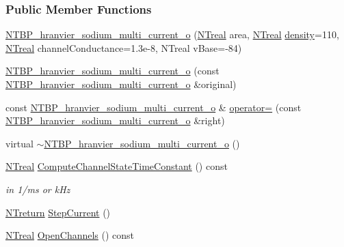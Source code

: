 \subsubsection*{Public Member Functions}
\begin{DoxyCompactItemize}
\item 
\hyperlink{class_n_t_b_p__hranvier__sodium__multi__current__o_ab0c07ce814be79296c596cf1e4e3e37b}{NTBP\_\-hranvier\_\-sodium\_\-multi\_\-current\_\-o} (\hyperlink{nt__types_8h_a814a97893e9deb1eedcc7604529ba80d}{NTreal} area, \hyperlink{nt__types_8h_a814a97893e9deb1eedcc7604529ba80d}{NTreal} \hyperlink{class_n_t_b_p__multi__current__o_a82138baaa276b09c13038ca1fd6f08a7}{density}=110, \hyperlink{nt__types_8h_a814a97893e9deb1eedcc7604529ba80d}{NTreal} channelConductance=1.3e-\/8, NTreal vBase=-\/84)
\item 
\hyperlink{class_n_t_b_p__hranvier__sodium__multi__current__o_af6af8b5f9d5044c5d93cde6b5ea88cc3}{NTBP\_\-hranvier\_\-sodium\_\-multi\_\-current\_\-o} (const \hyperlink{class_n_t_b_p__hranvier__sodium__multi__current__o}{NTBP\_\-hranvier\_\-sodium\_\-multi\_\-current\_\-o} \&original)
\item 
const \hyperlink{class_n_t_b_p__hranvier__sodium__multi__current__o}{NTBP\_\-hranvier\_\-sodium\_\-multi\_\-current\_\-o} \& \hyperlink{class_n_t_b_p__hranvier__sodium__multi__current__o_ad45f42a51e49c41000abe64015884d8e}{operator=} (const \hyperlink{class_n_t_b_p__hranvier__sodium__multi__current__o}{NTBP\_\-hranvier\_\-sodium\_\-multi\_\-current\_\-o} \&right)
\item 
virtual \hyperlink{class_n_t_b_p__hranvier__sodium__multi__current__o_a4f1faedb5b239dfaf4a31141201ae8ce}{$\sim$NTBP\_\-hranvier\_\-sodium\_\-multi\_\-current\_\-o} ()
\item 
\hyperlink{nt__types_8h_a814a97893e9deb1eedcc7604529ba80d}{NTreal} \hyperlink{class_n_t_b_p__hranvier__sodium__multi__current__o_a971eb68cf9f91cf319b8fe5b03a71283}{ComputeChannelStateTimeConstant} () const 
\begin{DoxyCompactList}\small\item\em in 1/ms or kHz \item\end{DoxyCompactList}\item 
\hyperlink{nt__types_8h_ab9564ee8f091e809d21b8451c6683c53}{NTreturn} \hyperlink{class_n_t_b_p__hranvier__sodium__multi__current__o_a316e744e5c43286d1771b629126720d4}{StepCurrent} ()
\item 
\hyperlink{nt__types_8h_a814a97893e9deb1eedcc7604529ba80d}{NTreal} \hyperlink{class_n_t_b_p__hranvier__sodium__multi__current__o_acc15941be12862e76f6d0ff4d9648c4d}{OpenChannels} () const 

\end{DoxyCompactItemize}
